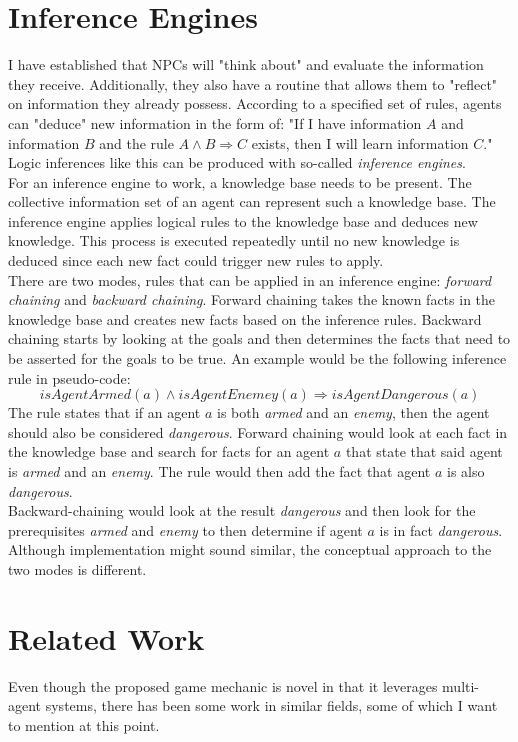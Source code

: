 \section{Inference Engines}
I have established that NPCs will "think about" and evaluate the information they receive. Additionally, they also have a routine that allows them to "reflect" on information they already possess. According to a specified set of rules, agents can "deduce" new information in the form of: "If I have information $A$ and information $B$ and the rule $A \wedge B \Rightarrow C$ exists, then I will learn information $C$." Logic inferences like this can be produced with so-called \textit{inference engines}.~\cite{Hayes1983}\\
For an inference engine to work, a knowledge base needs to be present. The collective information set of an agent can represent such a knowledge base. The inference engine applies logical rules to the knowledge base and deduces new knowledge. This process is executed repeatedly until no new knowledge is deduced since each new fact could trigger new rules to apply.\\
There are two modes, rules that can be applied in an inference engine: \textit{forward chaining} and \textit{backward chaining}. Forward chaining takes the known facts in the knowledge base and creates new facts based on the inference rules. Backward chaining starts by looking at the goals and then determines the facts that need to be asserted for the goals to be true. An example would be the following inference rule in pseudo-code:
\begin{equation*}
	\textit{isAgentArmed}(a) \wedge \textit{isAgentEnemey}(a) \Rightarrow \textit{isAgentDangerous}(a)
\end{equation*}
The rule states that if an agent $a$ is both \textit{armed} and an \textit{enemy}, then the agent should also be considered \textit{dangerous}. Forward chaining would look at each fact in the knowledge base and search for facts for an agent $a$ that state that said agent is \textit{armed} and an \textit{enemy}. The rule would then add the fact that agent $a$ is also \textit{dangerous}.\\
Backward-chaining would look at the result \textit{dangerous} and then look for the prerequisites \textit{armed} and \textit{enemy} to then determine if agent $a$ is in fact \textit{dangerous}. Although implementation might sound similar, the conceptual approach to the two modes is different.~\cite{Feigenbaum1981}
\section{Related Work}
Even though the proposed game mechanic is novel in that it leverages multi-agent systems, there has been some work in similar fields, some of which I want to mention at this point.
